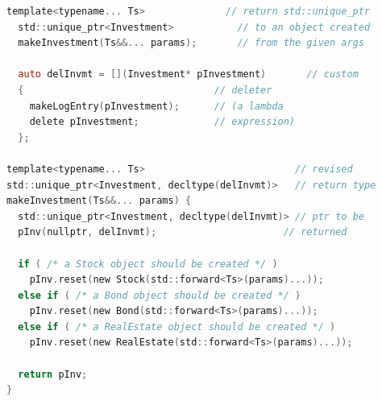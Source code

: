 \documentclass[a4paper]{article}
\theoremstyle{definition}
\begin{document}
\begin{lstlisting}[language=C]
  template<typename... Ts>              // return std::unique_ptr
  std::unique_ptr<Investment>           // to an object created
  makeInvestment(Ts&&... params);       // from the given args

  auto delInvmt = [](Investment* pInvestment)       // custom
  {                                 // deleter
    makeLogEntry(pInvestment);      // (a lambda
    delete pInvestment;             // expression)
  };

template<typename... Ts>                          // revised
std::unique_ptr<Investment, decltype(delInvmt)>   // return type
makeInvestment(Ts&&... params) {
  std::unique_ptr<Investment, decltype(delInvmt)> // ptr to be
  pInv(nullptr, delInvmt);                      // returned

  if ( /* a Stock object should be created */ ) 
    pInv.reset(new Stock(std::forward<Ts>(params)...));
  else if ( /* a Bond object should be created */ ) 
    pInv.reset(new Bond(std::forward<Ts>(params)...));
  else if ( /* a RealEstate object should be created */ ) 
    pInv.reset(new RealEstate(std::forward<Ts>(params)...));

  return pInv;
}
\end{lstlisting}
\end{document}
